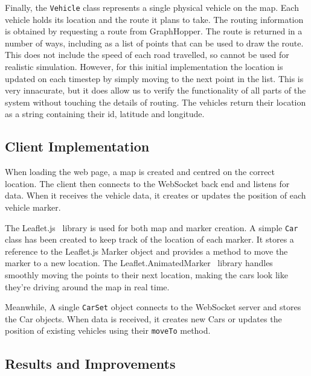\documentclass[ %
                    author={Alexander Hill},
                supervisor={Dr. Benjamin Sach},
                    degree={MEng},
                     title={MARMOSET},
                  subtitle={Multi-Agent Route Management using Online Simulation for Efficient Transportation},
                      type={research},
                      year={2016} ]{dissertation}
\begin{document}
Finally, the \texttt{Vehicle} class represents a single physical vehicle on the
map. Each vehicle holds its location and the route it plans to take. The routing
information is obtained by requesting a route from GraphHopper. The route is
returned in a number of ways, including as a list of points that can be used to
draw the route. This does not include the speed of each road travelled, so
cannot be used for realistic simulation. However, for this initial
implementation the location is updated on each timestep by simply moving to the
next point in the list. This is very innacurate, but it does allow us to verify
the functionality of all parts of the system without touching the details of
routing. The vehicles return their location as a string containing their id,
latitude and longitude.

\subsection{Client Implementation}

When loading the web page, a map is created and centred on the correct
location.  The client then connects to the WebSocket back end and listens for
data. When it receives the vehicle data, it creates or updates the position of
each vehicle marker.

The Leaflet.js~\cite{leaflet} library is used for both map and marker creation.
A simple \texttt{Car} class has been created to keep track of the location of
each marker. It stores a reference to the Leaflet.js Marker object and provides
a method to move the marker to a new location. The
Leaflet.AnimatedMarker~\cite{animarker} library handles smoothly moving the
points to their next location, making the cars look like they're driving around
the map in real time.

Meanwhile, A single \texttt{CarSet} object connects to the WebSocket server and
stores the Car objects. When data is received, it creates new Cars or updates
the position of existing vehicles using their \texttt{moveTo} method.

\subsection{Results and Improvements}
\end{document}
